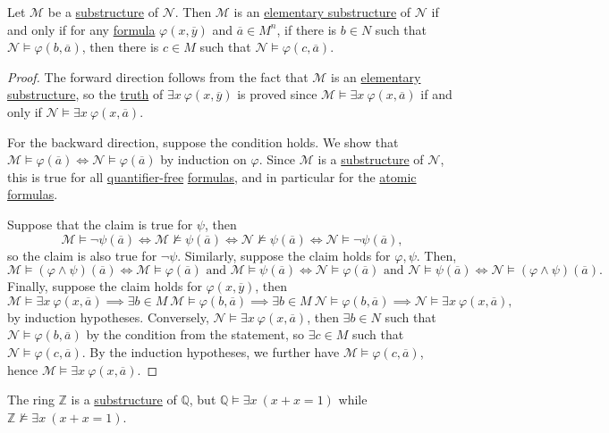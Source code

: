 \begin{proposition}\label{prop:Tarski-Vaught-test}
	Let \(\mathcal{M} \) be a \hyperref[def:substructure]{substructure} of \(\mathcal{N} \). Then \(\mathcal{M} \) is an \hyperref[def:elementary-substructure]{elementary substructure} of \(\mathcal{N} \) if and only if for any \hyperref[def:formula]{formula} \(\varphi (x, \overline{y} )\) and \(\overline{a} \in M^n\), if there is \(b\in N\) such that \(\mathcal{N} \models \varphi (b, \overline{a} )\), then there is \(c\in M\) such that \(\mathcal{N} \models \varphi (c, \overline{a} )\).
\end{proposition}
\begin{proof}
	The forward direction follows from the fact that \(\mathcal{M} \) is an \hyperref[def:elementary-substructure]{elementary substructure}, so the \hyperref[def:truth]{truth} of \(\exists x\ \varphi (x, \overline{y} )\) is proved since \(\mathcal{M} \models \exists x\ \varphi (x, \overline{a} )\) if and only if \(\mathcal{N} \models \exists x\ \varphi (x, \overline{a} )\).

	For the backward direction, suppose the condition holds. We show that \(\mathcal{M} \models \varphi (\overline{a} )\iff \mathcal{N} \models \varphi (\overline{a} )\) by induction on \(\varphi \). Since \(\mathcal{M} \) is a \hyperref[def:substructure]{substructure} of \(\mathcal{N} \), this is true for all \hyperref[not:quantifier-free]{quantifier-free} \hyperref[def:formula]{formulas}, and in particular for the \hyperref[not:atomic]{atomic} \hyperref[def:formula]{formulas}.

	Suppose that the claim is true for \(\psi \), then
	\[
		\mathcal{M} \models \lnot \psi (\overline{a} )
		\iff \mathcal{M} \not \models \psi (\overline{a} )
		\iff \mathcal{N} \not \models \psi (\overline{a} )
		\iff \mathcal{N} \models \lnot \psi (\overline{a} ),
	\]
	so the claim is also true for \(\lnot \psi \). Similarly, suppose the claim holds for \(\varphi , \psi \). Then,
	\[
		\mathcal{M} \models (\varphi \land \psi )(\overline{a} )
		\iff \mathcal{M} \models \varphi (\overline{a} ) \text{ and } \mathcal{M} \models \psi (\overline{a} )
		\iff \mathcal{N} \models \varphi (\overline{a} ) \text{ and } \mathcal{N} \models \psi (\overline{a} )
		\iff \mathcal{N} \models (\varphi \land \psi )(\overline{a} ).
	\]
	Finally, suppose the claim holds for \(\varphi (x, \overline{y} )\), then
	\[
		\mathcal{M} \models \exists x\ \varphi (x, \overline{a} )
		\implies \exists b\in M \ \mathcal{M} \models \varphi (b, \overline{a} )
		\implies \exists b\in M \ \mathcal{N} \models \varphi (b, \overline{a} )
		\implies \mathcal{N} \models \exists x\ \varphi (x, \overline{a} ),
	\]
	by induction hypotheses. Conversely, \(\mathcal{N} \models \exists x\ \varphi (x, \overline{a} )\), then \(\exists b\in N\) such that \(\mathcal{N} \models \varphi (b, \overline{a} )\) by the condition from the statement, so \(\exists c\in M\) such that \(\mathcal{N} \models \varphi (c, \overline{a} )\). By the induction hypotheses, we further have \(\mathcal{M} \models \varphi (c, \overline{a} )\), hence \(\mathcal{M} \models \exists x\ \varphi (x, \overline{a} )\).
\end{proof}

\begin{eg}
	The ring \(\mathbb{Z} \) is a \hyperref[def:substructure]{substructure} of \(\mathbb{Q} \), but \(\mathbb{Q} \models \exists x\ (x+x=1)\) while \(\mathbb{Z} \not \models \exists x\ (x+x=1)\).
\end{eg}
